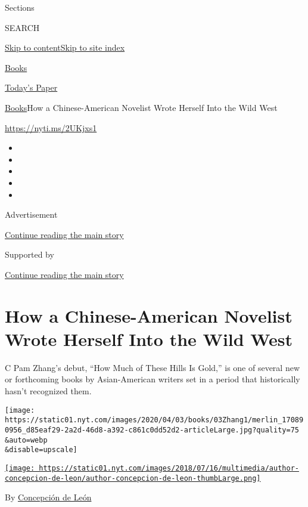 Sections

SEARCH

\protect\hyperlink{site-content}{Skip to
content}\protect\hyperlink{site-index}{Skip to site index}

\href{https://www.nytimes.com/section/books}{Books}

\href{https://myaccount.nytimes.com/auth/login?response_type=cookie\&client_id=vi}{}

\href{https://www.nytimes.com/section/todayspaper}{Today's Paper}

\href{/section/books}{Books}\textbar{}How a Chinese-American Novelist
Wrote Herself Into the Wild West

\url{https://nyti.ms/2UKjxs1}

\begin{itemize}
\item
\item
\item
\item
\item
\end{itemize}

Advertisement

\protect\hyperlink{after-top}{Continue reading the main story}

Supported by

\protect\hyperlink{after-sponsor}{Continue reading the main story}

\hypertarget{how-a-chinese-american-novelist-wrote-herself-into-the-wild-west}{%
\section{How a Chinese-American Novelist Wrote Herself Into the Wild
West}\label{how-a-chinese-american-novelist-wrote-herself-into-the-wild-west}}

C Pam Zhang's debut, ``How Much of These Hills Is Gold,'' is one of
several new or forthcoming books by Asian-American writers set in a
period that historically hasn't recognized them.

\texttt{[image: https://static01.nyt.com/images/2020/04/03/books/03Zhang1/merlin\_170890956\_d85eaf29-2a2d-46d8-a392-c861c0dd52d2-articleLarge.jpg?quality=75\\\&auto=webp\\\&disable=upscale]}

\href{https://www.nytimes.com/by/concepcion-de-leon}{\texttt{[image: https://static01.nyt.com/images/2018/07/16/multimedia/author-concepcion-de-leon/author-concepcion-de-leon-thumbLarge.png]}}

By \href{https://www.nytimes.com/by/concepcion-de-leon}{Concepción de
León}

